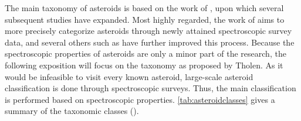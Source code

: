 The main taxonomy of asteroids is based on the work of \cite{taxonomy}, upon which several subsequent studies have expanded. Most highly regarded, the work of \cite{smassii} aims to more precisely categorize asteroids through newly attained spectroscopic survey data, and several others such as \cite{newClassification} have further improved this process. Because the spectroscopic properties of asteroids are only a minor part of the research, the following exposition will focus on the taxonomy as proposed by Tholen. As it would be infeasible to visit every known asteroid, large-scale asteroid classification is done through spectroscopic surveys. Thus, the main classification is performed based on spectroscopic properties. \autoref{tab:asteroidclasses} gives a summary of the taxonomic classes (\cite{spectroscopicProperties}).\\

